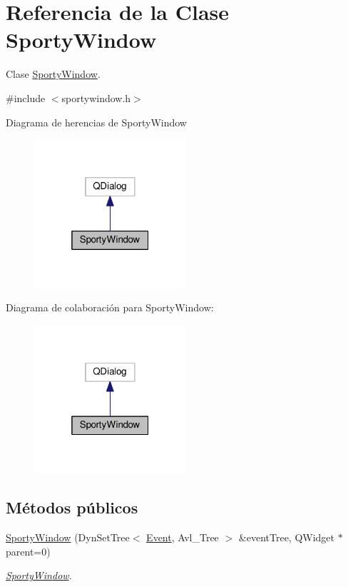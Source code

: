 \hypertarget{class_sporty_window}{}\section{Referencia de la Clase Sporty\+Window}
\label{class_sporty_window}


Clase \hyperlink{class_sporty_window}{Sporty\+Window}.  




{\ttfamily \#include $<$sportywindow.\+h$>$}



Diagrama de herencias de Sporty\+Window\nopagebreak
\begin{figure}[H]
\begin{center}
\leavevmode
\includegraphics[width=160pt]{class_sporty_window__inherit__graph}
\end{center}
\end{figure}


Diagrama de colaboración para Sporty\+Window\+:\nopagebreak
\begin{figure}[H]
\begin{center}
\leavevmode
\includegraphics[width=160pt]{class_sporty_window__coll__graph}
\end{center}
\end{figure}
\subsection*{Métodos públicos}
\begin{DoxyCompactItemize}
\item 
\hyperlink{class_sporty_window_aa6648488a2edf18678b39156fbf43d63}{Sporty\+Window} (Dyn\+Set\+Tree$<$ \hyperlink{class_event}{Event}, Avl\+\_\+\+Tree $>$ \&event\+Tree, Q\+Widget $\ast$parent=0)
\begin{DoxyCompactList}\small\item\em \hyperlink{class_sporty_window}{Sporty\+Window}. \end{DoxyCompactList}\end{DoxyCompactItemize}


